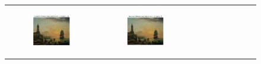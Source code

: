 \documentclass[hidelinks,12pt]{article}
\begin{document}
\begin{figure}[!h]
{\begin{tabular}{cccc}
				\begin{subfigure}[h]{0.25\textwidth}
					\centering
					\includegraphics[width=\textwidth]{figures/gaussian_filter/9.png}
				\end{subfigure} &
				\begin{subfigure}[h]{0.25\textwidth}
					\centering
					\includegraphics[width=\textwidth]{figures/gaussian_filter/10.png}
				\end{subfigure} &
				\begin{subfigure}[h]{0.25\textwidth}
					\centering

\end{subfigure}
\end{tabular}}
\end{figure}
\end{document}
